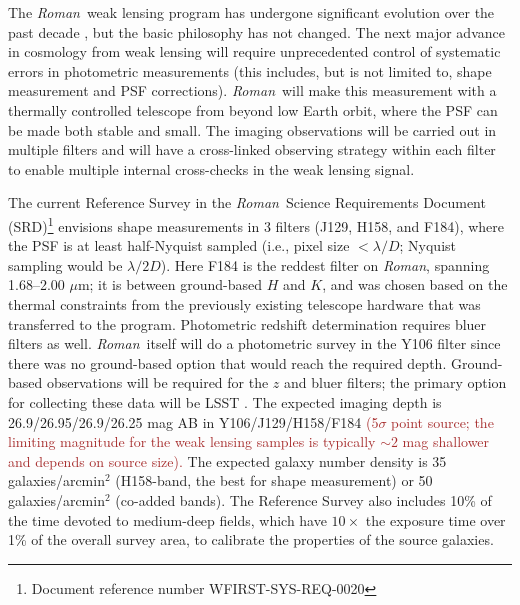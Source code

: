 \documentclass[usenatbib]{mnras}
\newcommand{\wfirst}{{\slshape Roman}}
\newcommand{\changetext}[1]{\textcolor{brown}{#1}}
\begin{document}
The \wfirst\ weak lensing program has undergone significant evolution over the past decade \citep{2011arXiv1108.1374G, 2012arXiv1208.4012G, 2013arXiv1305.5422S, 2015arXiv150303757S, 2018arXiv180403628D, 2019arXiv190205569A}, but the basic philosophy has not changed. The next major advance in cosmology from weak lensing will require unprecedented control of systematic errors in photometric measurements (this includes, but is not limited to, shape measurement and PSF corrections). \wfirst\ will make this measurement with a thermally controlled telescope from beyond low Earth orbit, where the PSF can be made both stable and small. The imaging observations will be carried out in multiple filters and will have a cross-linked observing strategy within each filter to enable multiple internal cross-checks in the weak lensing signal.

The current Reference Survey in the \wfirst\ Science Requirements Document (SRD)\footnote{Document reference number WFIRST-SYS-REQ-0020} envisions shape measurements in 3 filters (J129, H158, and F184), where the PSF is at least half-Nyquist sampled (i.e., pixel size $<\lambda/D$; Nyquist sampling would be $\lambda/2D$). Here F184 is the reddest filter on \wfirst, spanning 1.68--2.00 $\mu$m; it is between ground-based $H$ and $K$, and was chosen based on the thermal constraints from the previously existing telescope hardware that was transferred to the program. Photometric redshift determination requires bluer filters as well. \wfirst\ itself will do a photometric survey in the Y106 filter since there was no ground-based option that would reach the required depth. Ground-based observations will be required for the $z$ and bluer filters; the primary option for collecting these data will be LSST \citep{2009arXiv0912.0201L,2019ApJ...873..111I}.  The expected imaging depth is 26.9/26.95/26.9/26.25 mag AB in Y106/J129/H158/F184 \changetext{(5$\sigma$ point source; the limiting magnitude for the weak lensing samples is typically $\sim 2$ mag shallower and depends on source size).} The expected galaxy number density is 35 galaxies/arcmin$^2$ (H158-band, the best for shape measurement) or 50 galaxies/arcmin$^2$ (co-added bands). The Reference Survey also includes 10\% of the time devoted to medium-deep fields, which have $10\times$ the exposure time over 1\% of the overall survey area, to calibrate the properties of the source galaxies. 
\end{document}
